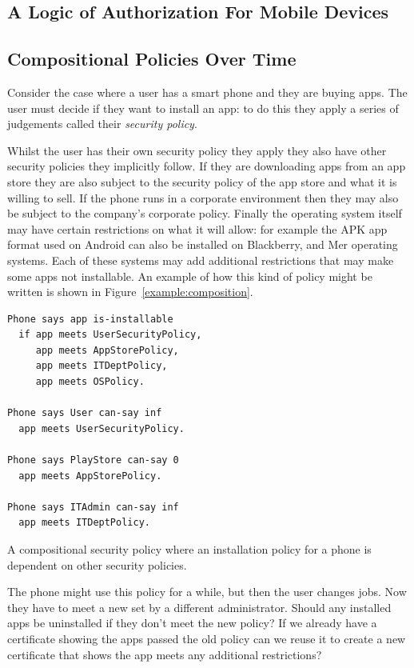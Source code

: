 \documentclass[a4paper]{article}
\begin{document}
\subsection{A Logic of Authorization For Mobile Devices}


\subsection{Compositional Policies Over Time}

Consider the case where a user has a smart phone and they are buying apps.  The
user must decide if they want to install an app: to do this they apply a series
of judgements called their \emph{security policy}.  

Whilst the user has their own security policy they apply they also have other
security policies they implicitly follow.  If they are downloading apps from an
app store they are also subject to the security policy of the app store and what
it is willing to sell.  If the phone runs in a corporate environment then they
may also be subject to the company's corporate policy.  Finally the operating
system itself may have certain restrictions on what it will allow: for example
the APK app format used on Android can also be installed on Blackberry, and Mer
operating systems.  Each of these systems may add additional restrictions that
may make some apps not installable.  An example of how this kind of policy might
be written is shown in Figure~\ref{example:composition}.

\begin{marginfigure}\label{example:composition}
  \begin{lstlisting}[language=SecPAL]
Phone says app is-installable
  if app meets UserSecurityPolicy,
     app meets AppStorePolicy,
     app meets ITDeptPolicy,
     app meets OSPolicy.

Phone says User can-say inf
  app meets UserSecurityPolicy.

Phone says PlayStore can-say 0
  app meets AppStorePolicy.

Phone says ITAdmin can-say inf
  app meets ITDeptPolicy.
  \end{lstlisting}
  \caption{A compositional security policy where an installation policy for a
    phone is dependent on other security policies.}
\end{marginfigure}
     
The phone might use this policy for a while, but then the user changes jobs.
Now they have to meet a new  set by a different administrator.
Should any installed apps be uninstalled if they don't meet the new policy?  If
we already have a certificate showing the apps passed the old policy can we
reuse it to create a new certificate that shows the app meets any additional
restrictions?
\end{document}
